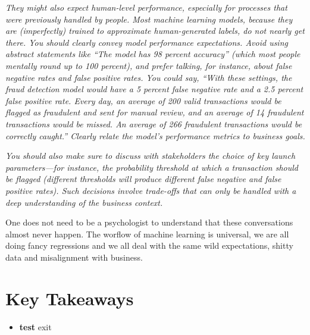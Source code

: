 \textit{They might also expect human-level performance, especially for processes that were previously handled by people. Most machine learning models, because they are (imperfectly) trained to approximate human-generated labels, do not nearly get there. You should clearly convey model performance expectations. Avoid using abstract statements like “The model has 98 percent accuracy” (which most people mentally round up to 100 percent), and prefer talking, for instance, about false negative rates and false positive rates. You could say, “With these settings, the fraud detection model would have a 5 percent false negative rate and a 2.5 percent false positive rate. Every day, an average of 200 valid transactions would be flagged as fraudulent and sent for manual review, and an average of 14 fraudulent transactions would be missed. An average of 266 fraudulent transactions would be correctly caught.” Clearly relate the model’s performance metrics to business goals.}


\textit{You should also make sure to discuss with stakeholders the choice of key launch parameters—for instance, the probability threshold at which a transaction should be flagged (different thresholds will produce different false negative and false positive rates). Such decisions involve trade-offs that can only be handled with a deep understanding of the business context.}\cite{chollet2022} 

One does not need to be a psychologist to understand that these conversations almost never happen. The worflow of machine learning is universal, we are all doing fancy regressions and we all deal with the same wild expectations, shitty data and misalignment with business. 

\section{Key Takeaways}

\begin{itemize}
    \item \textbf{test} exit
\end{itemize}

